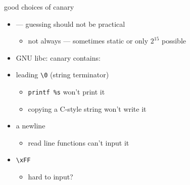 
\begin{frame}{good choices of canary}
\begin{itemize}
\item {} --- guessing should not be practical
    \begin{itemize}
    \item not always --- sometimes static or only $2^{15}$ possible
    \end{itemize}
\item GNU libc: canary contains:
\vspace{.5cm}
    \item leading {\tt \textbackslash 0} (string terminator)
        \begin{itemize}
        \item {\tt printf \%s} won't print it
        \item copying a C-style string won't write it
        \end{itemize}
    \item a newline
        \begin{itemize}
        \item read line functions can't input it
        \end{itemize}
    \item {\tt \textbackslash xFF}
        \begin{itemize}
        \item hard to input?
        \end{itemize}
\end{itemize}
\end{frame}
